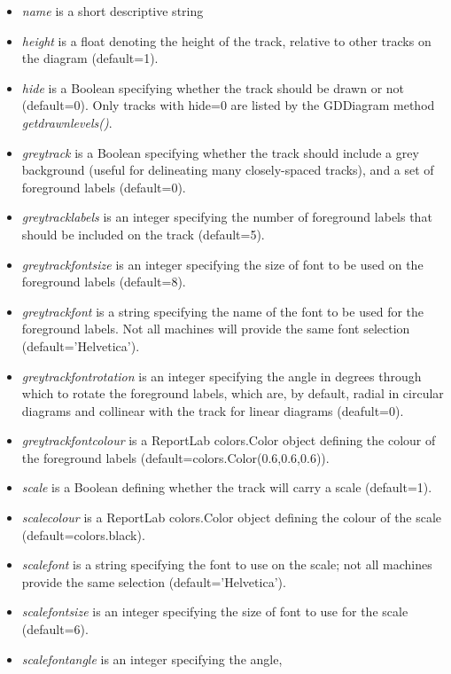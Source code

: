 \documentclass{article}
\begin{document}
\begin{itemize}
	\item \textit{name} is a short descriptive string
	\item \textit{height} is a float denoting the height of the track, 
	relative to other tracks on the diagram (default=1).
	\item \textit{hide} is a Boolean specifying whether the track should 
	be drawn or not (default=0).  Only tracks with hide=0 are listed by 
	the GDDiagram method \textit{get\us drawn\us levels()}.
	\item \textit{greytrack} is a Boolean specifying whether the track 
	should include a grey background (useful for delineating many 
	closely-spaced tracks), and a set of foreground labels (default=0).
	\item \textit{greytrack\us labels} is an integer specifying the number 
	of foreground labels that should be included on the track 
	(default=5).
	\item \textit{greytrack\us fontsize} is an integer specifying the size 
	of font to be used on the foreground labels (default=8).
	\item \textit{greytrack\us font} is a string specifying the name of the
	font to be used for the foreground labels.  Not all machines will 
	provide the same font selection (default='Helvetica').
	\item \textit{greytrack\us font\us rotation} is an integer specifying 
	the angle in degrees through which to rotate the foreground labels, 
	which are, by default, radial in circular diagrams and collinear with 
	the track for linear diagrams (deafult=0).
	\item \textit{greytrack\us font\us colour} is a ReportLab 
	colors.Color object defining the colour of the foreground labels
	(default=colors.Color(0.6,0.6,0.6)).
	\item \textit{scale} is a Boolean defining whether the track will 
	carry a scale (default=1).
	\item \textit{scale\us colour} is a ReportLab colors.Color object 
	defining the colour of the scale (default=colors.black).
	\item \textit{scale\us font} is a string specifying the font to use 
	on the scale; not all machines provide the same selection 
	(default='Helvetica').
	\item \textit{scale\us fontsize} is an integer specifying the size of 
	font to use for the scale (default=6).
	\item \textit{scale\us fontangle} is an integer specifying the angle, 

\end{itemize}
\end{document}
